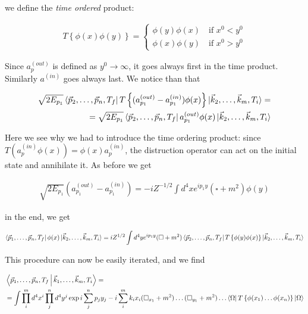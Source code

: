 \documentclass{report}
\begin{document}
we define the \emph{time ordered} product: 

\begin{align}
    T\left\{\phi(x) \phi(y) \right\} = \begin{cases}
        \phi(y)\phi(x) \quad \text{if } x^0 < y^0 \\
        \phi(x)\phi(y) \quad \text{if } x^0 > y^0 
    \end{cases}
\end{align}

Since \(a_p^{(out)}\) is defined as \(y^0 \rightarrow \infty\), it goes always first in the time product. Similarly \(a^{(in)}\) goes always last. We notice than that 

\begin{align}
    \sqrt{2E_{p_1}}\bra{\vec{p}_2, \ldots, \vec{p}_n, T_f}T\left\{(a_{p_1}^{(out)}-a_{p_1}^{(in)})\phi(x)\right\}\ket{\vec{k}_2, \ldots, \vec{k}_m, T_i} = \\
    = \sqrt{2E_{p_1}}\bra{\vec{p}_2, \ldots, \vec{p}_n, T_f}a_{p_1}^{(out)}\phi(x)\ket{\vec{k}_2, \ldots, \vec{k}_m, T_i}
\end{align}

Here we see why we had to introduce the time ordering product: since \(T(a_p^{(in)}\phi(x)) = \phi(x)a_p^{(in)}\), the distruction operator can act on the initial state and annihilate it. As before we get 

\begin{align}
    \sqrt{2E_{p_1}}(a^{(out)}_{p_1} -a^{(in)}_{p_1}) = -iZ^{-1/2}\int d^4x e^{ip_1 y}(\square +m^2)\phi(y)
\end{align}

in the end, we get 

\begin{align}
    \bra{\vec{p}_1, \ldots, \vec{p}_n, T_f}\phi(x)\ket{\vec{k}_2, \ldots, \vec{k}_m, T_i} = iZ^{1/2}\int d^4y e^{ip_1y}(\square +m^2)\bra{\vec{p}_2, \ldots, \vec{p}_n, T_f}T\left\{\phi(y)\phi(x)\right\}\ket{\vec{k}_2, \ldots, \vec{k}_m, T_i}
\end{align}

This procedure can now be easily iterated, and we find 

\begin{align}
    &\Braket{\vec{p}_1, \ldots, \vec{p}_n, T_f | \vec{k}_1, \ldots , \vec{k}_m, T_i} = \\
    &= \int \prod_i^m d^4x^i \prod_j^n d^4y^j \exp{i\sum_j^n p_jy_j - i\sum_i^m k_i x_i}(\square_{x_1}+m^2)\ldots(\square_{y_1} + m^2)\ldots \bra{\Omega}T\left\{\phi(x_1)\ldots\phi(x_n) \right\}\ket{\Omega}
\end{align}
\end{document}
